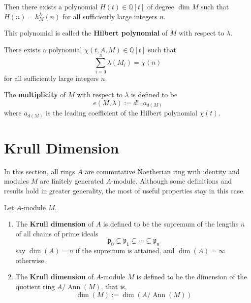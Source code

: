 \begin{corollary}
    Then there exists a polynomial
    $H(t)\in\mathbb{Q}[t]$ of degree $\dim M$ such that $H(n)=h_M^\lambda(n)$ for all sufficiently large integers $n$.

    This polynomial is called the \textbf{Hilbert polynomial} of $M$ with respect to $\lambda$.
\end{corollary}

\begin{corollary}
    There exists a polynomial $\chi(t,A,M)\in \mathbb{Q}[t]$ such that
    \begin{equation*}
        \sum_{i=0}^n \lambda\left(M_{i}\right)
        =
        \chi(n)
    \end{equation*}
    for all sufficiently large integers $n$.
\end{corollary}

\begin{definition}
    The \textbf{multiplicity} of $M$ with respect to $\lambda$ is defined to be
    \begin{equation*}
        e(M, \lambda)
        :=
        d! \cdot a_{d(M)}
    \end{equation*}
    where $a_{d(M)}$ is the leading coefficient of the Hilbert polynomial $\chi(t)$.
\end{definition}





\section{Krull Dimension}
In this section, all rings $A$ are commutative Noetherian ring with identity and modules $M$ are finitely generated $A$-module. Although some definitions and results hold in greater generality, the most of useful properties stay in this case.
\begin{definition}
    Let $A$-module $M$.
    \begin{enumerate}
        \item
              The \textbf{Krull dimension} of $A$ is defined to be the supremum of the lengths $n$ of all chains of prime ideals
              \begin{equation*}
                  \mathfrak{p}_0 \subsetneq \mathfrak{p}_1 \subsetneq \cdots \subsetneq \mathfrak{p}_n
              \end{equation*}
              say $\dim(A)=n$ if the supremum is attained, and $\dim(A)=\infty$ otherwise.
        \item
              The \textbf{Krull dimension} of $A$-module $M$ is defined to be the dimension of the quotient ring $A/\operatorname{Ann}(M)$, that is,
              \begin{equation*}
                  \dim(M)
                  :=
                  \dim\left(A/\operatorname{Ann}(M)\right)
              \end{equation*}
    \end{enumerate}
\end{definition}

